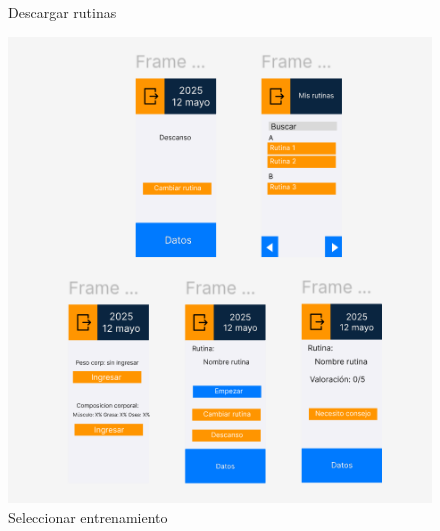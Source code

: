 \begin{figure}[H]
\begin{minipage}[b]{0.4\textwidth}
    \caption{Descargar rutinas}
    \label{fig:Descargar rutinas}
  \end{minipage}
  \begin{minipage}[b]{0.45\textwidth}
    \centering
    \includegraphics[width=\textwidth]{fotos/SeleccionarEntrenamiento.png}
    \caption{Seleccionar entrenamiento}
    \label{fig:Seleccionar entrenamiento}
  \end{minipage}
\end{figure}
  
